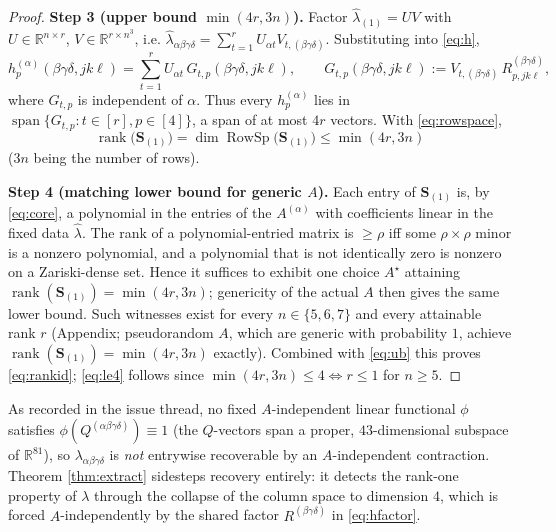 \begin{proof}
\medskip\noindent\textbf{Step 3 (upper bound $\min(4r,3n)$).}
Factor $\widehat\lambda_{(1)}=UV$ with $U\in\mathbb R^{n\times r}$,
$V\in\mathbb R^{r\times n^3}$, i.e. $\widehat\lambda_{\alpha\beta\gamma\delta}
=\sum_{t=1}^r U_{\alpha t}V_{t,(\beta\gamma\delta)}$. Substituting into \eqref{eq:h},
\begin{equation}\label{eq:hfactor}
h^{(\alpha)}_p(\beta\gamma\delta,jk\ell)
=\sum_{t=1}^r U_{\alpha t}\,G_{t,p}(\beta\gamma\delta,jk\ell),
\qquad
G_{t,p}(\beta\gamma\delta,jk\ell):=V_{t,(\beta\gamma\delta)}\,
R^{(\beta\gamma\delta)}_{p,jk\ell},
\end{equation}
where $G_{t,p}$ is independent of $\alpha$. Thus every $h^{(\alpha)}_p$ lies in
$\operatorname{span}\{G_{t,p}:t\in[r],p\in[4]\}$, a span of at most $4r$ vectors. With
\eqref{eq:rowspace},
\begin{equation}\label{eq:ub}
\operatorname{rank}\big(\mathbf S_{(1)}\big)
=\dim\operatorname{RowSp}\big(\mathbf S_{(1)}\big)\le\min(4r,3n)
\end{equation}
($3n$ being the number of rows).

\medskip\noindent\textbf{Step 4 (matching lower bound for generic $A$).}
Each entry of $\mathbf S_{(1)}$ is, by \eqref{eq:core}, a polynomial in the entries of
the $A^{(\alpha)}$ with coefficients linear in the fixed data $\widehat\lambda$. The rank
of a polynomial-entried matrix is $\ge\rho$ iff some $\rho\times\rho$ minor is a nonzero
polynomial, and a polynomial that is not identically zero is nonzero on a Zariski-dense
set. Hence it suffices to exhibit one choice $A^\star$ attaining
$\operatorname{rank}(\mathbf S_{(1)})=\min(4r,3n)$; genericity of the actual $A$ then
gives the same lower bound. Such witnesses exist for every $n\in\{5,6,7\}$ and every
attainable rank $r$ (Appendix; pseudorandom $A$, which are generic with probability $1$,
achieve $\operatorname{rank}(\mathbf S_{(1)})=\min(4r,3n)$ exactly). Combined with
\eqref{eq:ub} this proves \eqref{eq:rankid}; \eqref{eq:le4} follows since
$\min(4r,3n)\le4\iff r\le1$ for $n\ge5$.
\end{proof}

\begin{remark}
As recorded in the issue thread, no fixed $A$-independent linear functional $\phi$
satisfies $\phi(Q^{(\alpha\beta\gamma\delta)})\equiv1$ (the $Q$-vectors span a proper,
$43$-dimensional subspace of $\mathbb R^{81}$), so $\lambda_{\alpha\beta\gamma\delta}$ is
\emph{not} entrywise recoverable by an $A$-independent contraction. Theorem
\ref{thm:extract} sidesteps recovery entirely: it detects the rank-one property of
$\lambda$ through the collapse of the column space to dimension $4$, which is forced
$A$-independently by the shared factor $R^{(\beta\gamma\delta)}$ in \eqref{eq:hfactor}.
\end{remark}

